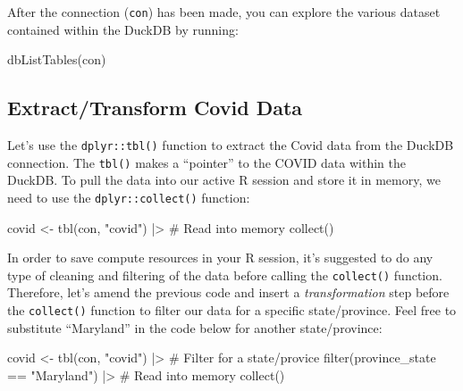 \documentclass[
  letterpaper,
  DIV=11,
  numbers=noendperiod]{scrreprt}
\newenvironment{Shaded}{\begin{snugshade}}{\end{snugshade}}
\newcommand{\CommentTok}[1]{\textcolor[rgb]{0.37,0.37,0.37}{#1}}
\newcommand{\FunctionTok}[1]{\textcolor[rgb]{0.28,0.35,0.67}{#1}}
\newcommand{\NormalTok}[1]{\textcolor[rgb]{0.00,0.23,0.31}{#1}}
\newcommand{\OtherTok}[1]{\textcolor[rgb]{0.00,0.23,0.31}{#1}}
\newcommand{\SpecialCharTok}[1]{\textcolor[rgb]{0.37,0.37,0.37}{#1}}
\newcommand{\StringTok}[1]{\textcolor[rgb]{0.13,0.47,0.30}{#1}}
\begin{document}
After the connection (\texttt{con}) has been made, you can explore the
various dataset contained within the DuckDB by running:

\begin{Shaded}
\begin{Highlighting}[]
\FunctionTok{dbListTables}\NormalTok{(con)}
\end{Highlighting}
\end{Shaded}

\subsection{Extract/Transform Covid
Data}\label{extracttransform-covid-data}

Let's use the \texttt{dplyr::tbl()} function to extract the Covid data
from the DuckDB connection. The \texttt{tbl()} makes a ``pointer'' to
the COVID data within the DuckDB. To pull the data into our active R
session and store it in memory, we need to use the
\texttt{dplyr::collect()} function:

\begin{Shaded}
\begin{Highlighting}[]
\NormalTok{covid }\OtherTok{\textless{}{-}} \FunctionTok{tbl}\NormalTok{(con, }\StringTok{"covid"}\NormalTok{) }\SpecialCharTok{|\textgreater{}} 
  \CommentTok{\# Read into memory}
  \FunctionTok{collect}\NormalTok{()}
\end{Highlighting}
\end{Shaded}

In order to save compute resources in your R session, it's suggested to
do any type of cleaning and filtering of the data before calling the
\texttt{collect()} function. Therefore, let's amend the previous code
and insert a \emph{transformation} step before the \texttt{collect()}
function to filter our data for a specific state/province. Feel free to
substitute ``Maryland'' in the code below for another state/province:

\begin{Shaded}
\begin{Highlighting}[]
\NormalTok{covid }\OtherTok{\textless{}{-}} \FunctionTok{tbl}\NormalTok{(con, }\StringTok{"covid"}\NormalTok{) }\SpecialCharTok{|\textgreater{}}
  \CommentTok{\# Filter for a state/provice}
  \FunctionTok{filter}\NormalTok{(province\_state }\SpecialCharTok{==} \StringTok{"Maryland"}\NormalTok{) }\SpecialCharTok{|\textgreater{}}
  \CommentTok{\# Read into memory}
  \FunctionTok{collect}\NormalTok{()}
\end{Highlighting}
\end{Shaded}
\end{document}
